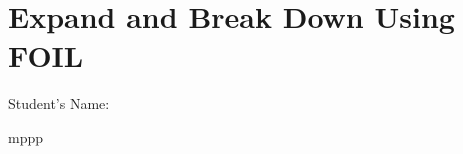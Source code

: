 \documentclass[12pt, a4paper, addpoints]{exam}
\newcommand{\ps}{\vspace{36mm}}
\newcommand{\monnonnonnon}{%
    \pgfmathtruncatemacro{\a}{random(2,9)} %
    \pgfmathtruncatemacro{\b}{random(2,9)} %
    \pgfmathtruncatemacro{\c}{random(1,9)} %
    \edef\result{(x + \b)(\a x + \c)}%
    \result
}
\begin{document}
\section*{Expand and Break Down Using FOIL}
\quad Student's Name: \underline{\hspace{5cm}}

\begin{questions}
\LARGE

\question
mppp
\setlength{\columnsep}{20pt}
\begin{multicols}{3}
\begin{parts}
    \part \( \monnonnonnon \)
    \ps
       \part \( \monnonnonnon \)
    \ps
       \part \( \monnonnonnon \)
    \ps
       \part \( \monnonnonnon \)
    \ps
       \part \( \monnonnonnon \)
    \ps
       \part \( \monnonnonnon \)
    \ps
       \part \( \monnonnonnon \)
    \ps
       \part \( \monnonnonnon \)
    \ps
       \part \( \monnonnonnon \)
    \ps
           \part \( \monnonnonnon \)
    \ps

\end{parts}
\end{multicols}
\end{questions}
\end{document}
